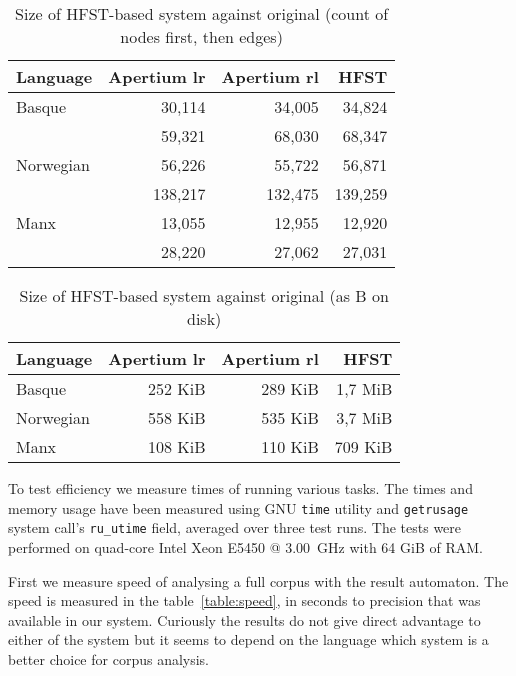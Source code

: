 \documentclass[a4paper]{article}
\begin{document}
\begin{table}[h]
\begin{center}
\begin{tabular}{|l|r|r|r|}
\hline
\bf Language & \bf Apertium lr & \bf Apertium rl & \bf HFST \\
\hline
Basque       & 30,114  & 34,005  & 34,824  \\
             & 59,321  & 68,030  & 68,347  \\
Norwegian    & 56,226  & 55,722  & 56,871  \\
             & 138,217 & 132,475 & 139,259 \\
Manx         & 13,055  & 12,955  & 12,920  \\
             & 28,220  & 27,062  & 27,031  \\
\hline
\end{tabular}
\caption{Size of HFST-based system against original (count of nodes first, then
edges)
\label{table:graph-size}}
\end{center}
\end{table}

\begin{table}[h]
\begin{center}
\begin{tabular}{|l|r|r|r|}
\hline
\bf Language & \bf Apertium lr & \bf Apertium rl & \bf HFST \\
\hline
Basque       & 252 KiB & 289 KiB & 1,7 MiB \\
Norwegian    & 558 KiB & 535 KiB & 3,7 MiB \\
Manx         & 108 KiB & 110 KiB & 709 KiB \\
\hline
\end{tabular}
\caption{Size of HFST-based system against original (as B on disk)
\label{table:size}}
\end{center}
\end{table}

To test efficiency we measure times of running various tasks.  The times and
memory usage have been measured using GNU \texttt{time} utility and
\texttt{getrusage} system call's \texttt{ru\_utime} field, averaged over three
test runs. The tests were performed on quad-core Intel Xeon E5450 @ 3.00~GHz
with 64 GiB of RAM. 

First we measure speed of analysing a full corpus with the result automaton.
The speed is measured in the table~\ref{table:speed}, in
seconds to precision that was available in our system. Curiously the results
do not give direct advantage to either of the system but it seems to
depend on the language which system is a better choice for corpus analysis.
\end{document}
